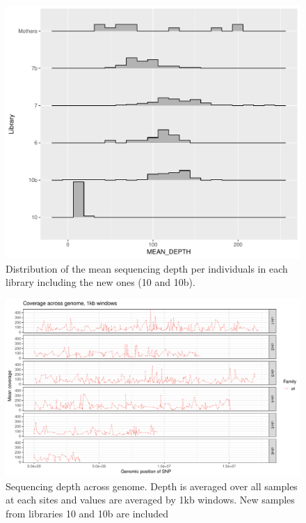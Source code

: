 \documentclass[10pt,a4paper]{report}
\begin{document}
\begin{figure}[h]
	\begin{center}
		\includegraphics[width=\textwidth]{add_samples/library_depth.pdf}
		\caption{Distribution of the mean sequencing depth per individuals in each library including the new ones (10 and 10b).}
		\label{mean_depth_add}
	\end{center}
\end{figure}

\begin{figure}[h]
	\begin{center}
		\includegraphics[width=\textwidth]{add_samples/cov_per_site.pdf}
		\caption{Sequencing depth across genome. Depth is averaged over all samples at each sites and values are averaged by 1kb windows. New samples from libraries 10 and 10b are included}
		\label{cov_genome_add}
	\end{center}
\end{figure}
\end{document}
